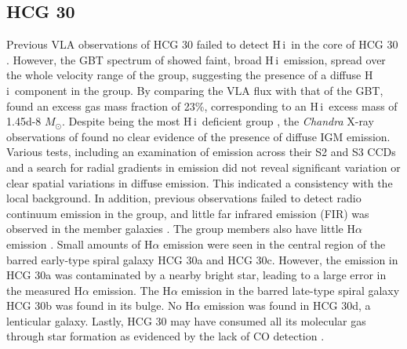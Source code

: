 \documentclass{aa}
\newcommand{\HI}{H\,{\sc i}}
\begin{document}
\subsection{HCG 30}
Previous VLA observations of HCG 30 failed to detect \HI\ in the core of HCG 30 \citep{2023A&A...670A..21J}. 
However, the GBT spectrum of \citet{2010ApJ...710..385B} showed faint, broad \HI\ emission, spread over the whole velocity range of the group, 
suggesting the presence of a diffuse \HI\ component in the group. 
By comparing the VLA flux with that of the GBT, \citet{2010ApJ...710..385B}   
found an excess gas mass fraction of 23\%, corresponding to an \HI\ excess mass of \num{1.45d-8} $M_{\odot}$. Despite being the most \HI\ deficient group \citep{2001A&A...377..812V}, the \textit{Chandra} 
X-ray observations of \citet{2008MNRAS.388.1245R} found no clear evidence of the presence of diffuse IGM emission. Various tests, including an examination of emission across their 
S2 and S3 CCDs and a search for radial gradients in emission did not reveal significant variation or clear spatial variations in diffuse emission. This indicated a consistency 
with the local background. In addition, previous observations failed to detect radio continuum emission in the group, and little far infrared emission (FIR) was observed in the member
galaxies \citep{2007NewAR..51...87V}. The group members also have little H$\alpha$ emission \citep{1998ApJS..117....1V}. Small amounts of H$\alpha$ emission were seen in the central 
region of the barred early-type spiral galaxy HCG 30a and HCG 30c. However, the emission in HCG 30a was contaminated by a nearby bright star, leading to a large error in the 
measured H$\alpha$  emission. The H$\alpha$ emission in the barred late-type spiral galaxy HCG 30b was found in its bulge. No H$\alpha$ emission was found in HCG 30d, a 
lenticular galaxy. Lastly, HCG 30 may have consumed all its molecular gas through star formation as evidenced by the lack of CO detection \citep{1998ApJ...497...89V}.  
\end{document}
